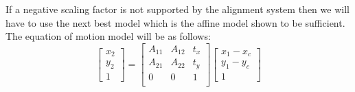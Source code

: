 \documentclass[a4paper]{article}
\begin{document}
\begin{enumerate}[label=(\alph*)]
	If a negative scaling factor is not supported by the alignment system then we will have to use the next best model which is the affine model shown to be sufficient. The equation of motion model will be as follows:
	\begin{equation}
		\begin{bmatrix}
			x_2\\y_2\\1
		\end{bmatrix}
		=
		\begin{bmatrix}
			A_{11} & A_{12} & t_x\\
			A_{21} & A_{22}  & t_y\\
			0           & 0           & 1\\
		\end{bmatrix}
		\begin{bmatrix}
			x_1-x_c\\y_1 - y_c\\1
		\end{bmatrix}
	\end{equation}
\end{enumerate}
\end{document}

